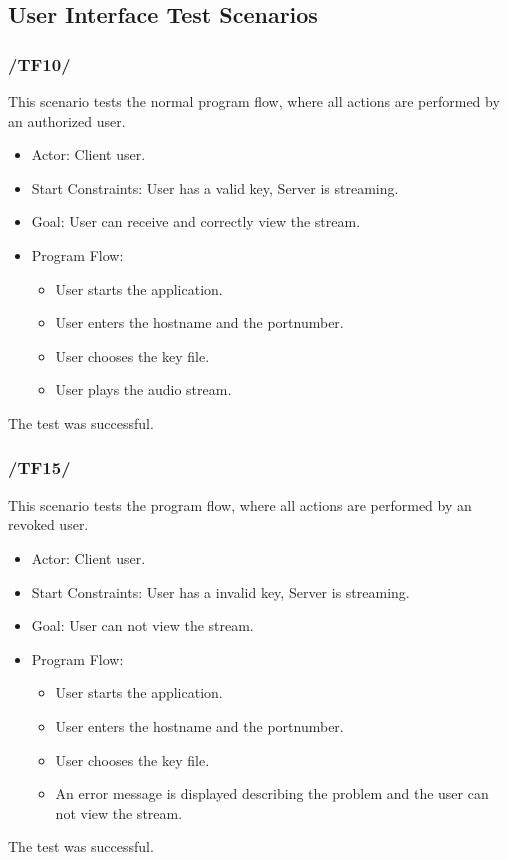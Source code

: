 \documentclass[a4paper,10pt]{scrartcl}
\begin{document}
\subsection{User Interface Test Scenarios}

\subsubsection{/TF10/}
This scenario tests the normal program flow, where all actions are performed by an authorized user.

\begin{itemize}
	\item Actor: Client user.
	\item Start Constraints: User has a valid key, Server is streaming.
	\item Goal: User can receive and correctly view the stream.
	\item Program Flow:
	\begin{itemize}
   \item User starts the application.
   \item User enters the hostname and the portnumber.
   \item User chooses the key file.
   \item User plays the audio stream.
\end{itemize}
\end{itemize}
The test was successful.

\subsubsection{/TF15/}
This scenario tests the program flow, where all actions are performed by an revoked user.

\begin{itemize}
	\item Actor: Client user.
	\item Start Constraints: User has a invalid key, Server is streaming.
	\item Goal: User can not view the stream.
	\item Program Flow:
	\begin{itemize}
   \item User starts the application.
   \item User enters the hostname and the portnumber.
   \item User chooses the key file.
   \item An error message is displayed describing the problem and the user can not view the stream.
\end{itemize}
\end{itemize}
The test was successful.
\end{document}
